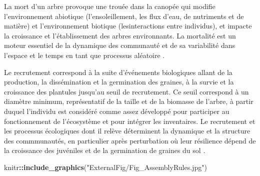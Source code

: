 \documentclass[
  11pt,
  french,
  A4paper,
  extrafontsizes,onecolumn,openright
  ]{memoir}
\newenvironment{Shaded}{\begin{snugshade}}{\end{snugshade}}
\newcommand{\KeywordTok}[1]{\textcolor[rgb]{0.13,0.29,0.53}{\textbf{#1}}}
\newcommand{\StringTok}[1]{\textcolor[rgb]{0.31,0.60,0.02}{#1}}
\newcommand{\OperatorTok}[1]{\textcolor[rgb]{0.81,0.36,0.00}{\textbf{#1}}}
\newcommand{\NormalTok}[1]{#1}
\begin{document}
La mort d'un arbre provoque une trouée dans la canopée qui modifie
l'environnement abiotique (l'ensoleillement, les flux d'eau, de
nutriments et de matière) et l'environnement biotique (lesinteractions
entre individus), et impacte la croissance et l'établissement des arbres
environnants. La mortalité est un moteur essentiel de la dynamique des
communauté et de sa variabilité dans l'espace et le temps en tant que
processus aléatoire
\autocites{Denslow1998}{Sheil2003}{Goulamoussene2017}{Otani2018}.

Le recrutement correspond à la suite d'événements biologiques allant de
la production, la dissémination et la germination des graines, à la
survie et la croissance des plantules jusqu'au seuil de recrutement. Ce
seuil correspond à un diamètre minimum, représentatif de la taille et de
la biomasse de l'arbre, à partir duquel l'individu est considéré comme
assez développé pour participer au fonctionnement de l'écosystème et
pour intégrer les inventaires. Le recrutement et les processus
écologiques dont il relève déterminent la dynamique et la structure des
commmunautés, en particulier après perturbation où leur résilience
dépend de la croissance des juvéniles et de la germination de graines du
sol \autocites{Denslow1980}{Schnitzer2001}{Asner2004}.

\begin{Shaded}
\begin{Highlighting}[]
\NormalTok{knitr}\OperatorTok{::}\KeywordTok{include_graphics}\NormalTok{(}\StringTok{"ExternalFig/Fig_AssemblyRules.jpg"}\NormalTok{)}
\end{Highlighting}
\end{Shaded}
\end{document}

